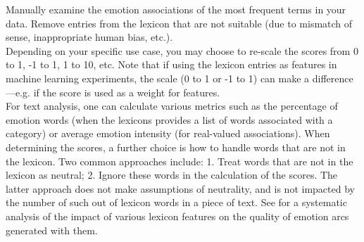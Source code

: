 \documentclass[11pt]{article}
\begin{document}

 Manually examine the emotion associations of the most frequent terms in your data. Remove entries from the lexicon that are not suitable (due to mismatch of sense, inappropriate human bias, etc.).\\[-10pt]

 Depending on your specific use case, you may choose to re-scale the scores from 0 to 1, -1 to 1, 1 to 10, etc. Note that if using the lexicon entries as features in machine learning experiments, the scale (0 to 1 or -1 to 1) can make a difference---e.g. if the score is used as a weight for features.\\[-10pt]

 For text analysis, one can calculate various metrics such as the percentage of emotion words (when the lexicons provides a list of words associated with a category) or average emotion intensity (for real-valued associations).
When determining the scores, a further choice is how to handle words that are not in the lexicon.
Two common approaches include: 1. Treat words that are not in the lexicon as neutral; 
2. Ignore these words in the calculation of the scores. The latter approach does not make assumptions of neutrality, and is not impacted by the number of such
out of lexicon words in a piece of text.
See  for a systematic analysis of the impact of various lexicon features on the quality of emotion arcs generated with them.\\[-10pt]
\end{document}
